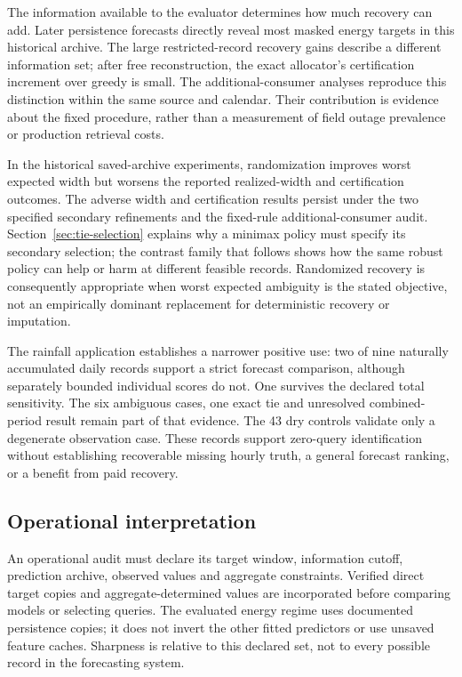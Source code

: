 \documentclass[12pt]{article}
\begin{document}
The information available to the evaluator determines how much recovery
can add. Later persistence forecasts directly reveal most masked energy
targets in this historical archive. The large restricted-record recovery
gains describe a different information set; after free reconstruction,
the exact allocator's certification increment over greedy is small.
The additional-consumer analyses reproduce this distinction within the
same source and calendar. Their contribution is evidence about the fixed
procedure, rather than a measurement of field outage prevalence or
production retrieval costs.

In the historical saved-archive experiments, randomization improves worst
expected width but worsens the reported realized-width and certification outcomes. The adverse width and certification results
persist under the two specified secondary refinements and the fixed-rule
additional-consumer audit. Section~\ref{sec:tie-selection} explains why a
minimax policy must specify its secondary selection; the contrast family
that follows shows how the same robust policy can help or harm at different
feasible records. Randomized recovery is consequently appropriate when
worst expected ambiguity is the stated objective, not an empirically
dominant replacement for deterministic recovery or imputation.

The rainfall application establishes a narrower positive use: two of nine
naturally accumulated daily records support a strict forecast comparison,
although separately bounded individual scores do not. One survives the
declared total sensitivity. The six ambiguous cases, one exact tie and
unresolved combined-period result remain part of that evidence. The 43
dry controls validate only a degenerate observation case. These records
support zero-query identification without establishing recoverable missing
hourly truth, a general forecast ranking, or a benefit from paid recovery.

\subsection{Operational interpretation}
An operational audit must declare its target window, information cutoff,
prediction archive, observed values and aggregate constraints. Verified
direct target copies and aggregate-determined values are incorporated
before comparing models or selecting queries. The evaluated energy regime
uses documented persistence copies; it does not invert the other fitted
predictors or use unsaved feature caches. Sharpness is relative to this
declared set, not to every possible record in the forecasting system.
\end{document}
